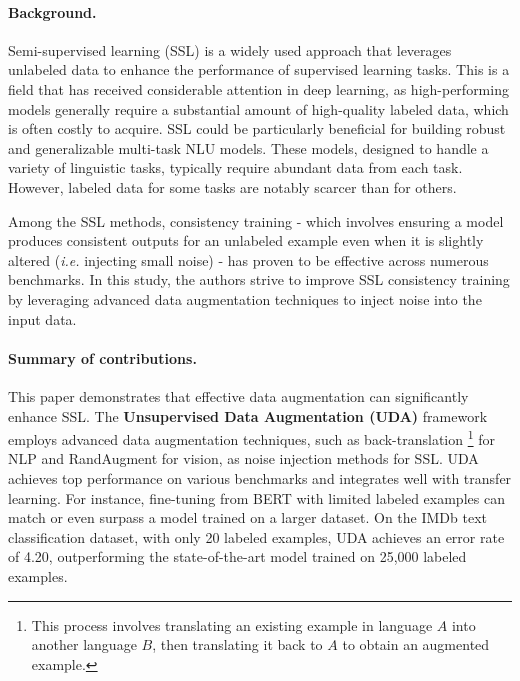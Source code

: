 \documentclass{article}
\begin{document}
\paragraph{Background.}

Semi-supervised learning (SSL) is a widely used approach that leverages unlabeled data to 
enhance the performance of supervised learning tasks. 
This is a field that has received considerable attention in deep learning, 
as high-performing models generally require a substantial amount of high-quality labeled data, 
which is often costly to acquire.
SSL could be particularly beneficial for building robust and 
generalizable multi-task NLU models. These models, designed to handle a variety of 
linguistic tasks, typically require abundant data from each task. However, labeled data 
for some tasks are notably scarcer than for others.

Among the SSL methods, consistency training - which involves ensuring a model produces 
consistent outputs for an unlabeled example even when it is slightly altered 
(\textit{i.e.} injecting small noise) - has proven to be effective across numerous benchmarks.
In this study, the authors strive to improve SSL consistency training by leveraging advanced
data augmentation techniques to inject noise into the input data.

\paragraph{Summary of contributions.}
This paper demonstrates that effective data augmentation can significantly enhance 
SSL. The \textbf{Unsupervised Data Augmentation (UDA)} framework employs advanced data 
augmentation techniques, such as back-translation 
\footnote{This process involves translating an existing example in 
language $A$ into another language $B$, then translating it back to $A$ to obtain an 
augmented example.} for NLP and RandAugment \cite{NEURIPS2020_d85b63ef} for vision, 
as noise injection methods for SSL. UDA achieves top performance on 
various benchmarks and integrates well with transfer learning. For instance, 
fine-tuning from BERT with limited labeled examples can match or even surpass a model 
trained on a larger dataset. On the IMDb text classification dataset, with only 20 
labeled examples, UDA achieves an error rate of 4.20, outperforming the state-of-the-art 
model trained on 25,000 labeled examples.
\end{document}
